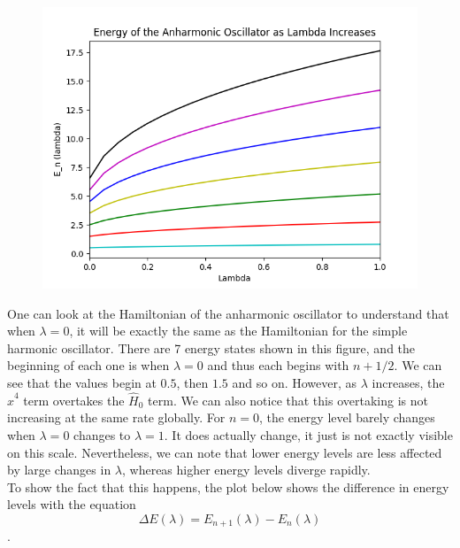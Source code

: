 \documentclass[12pt]{article}
\begin{document}
\begin{figure}[H]
\begin{center}
\includegraphics[scale=0.8]{energy_vs_lambda.png}
\end{center}
\end{figure}

One can look at the Hamiltonian of the anharmonic oscillator to understand that when $\lambda = 0$, it will be exactly the same as the Hamiltonian for the simple harmonic oscillator. There are 7 energy states shown in this figure, and the beginning of each one is when $\lambda = 0$ and thus each begins with $n+1/2$. We can see that the values begin at $0.5$, then $1.5$ and so on. However, as $\lambda$ increases, the $\hat{x}^4$ term overtakes the $\hat{H}_0$ term. We can also notice that this overtaking is not increasing at the same rate globally. For $n=0$, the energy level barely changes when $\lambda=0$ changes to $\lambda=1$. It does actually change, it just is not exactly visible on this scale. Nevertheless, we can note that lower energy levels are less affected by large changes in $\lambda$, whereas higher energy levels diverge rapidly. \\

To show the fact that this happens, the plot below shows the difference in energy levels with the equation $$ \Delta E(\lambda) = E_{n+1} (\lambda) - E_n (\lambda) $$.
\end{document}
